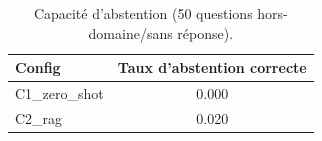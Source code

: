 \begin{table}[t]
\centering
\caption{Capacité d'abstention (50 questions hors-domaine/sans réponse).}
\label{tab:abstention}
\begin{tabular}{lc}
\toprule
Config & Taux d'abstention correcte \\
\midrule
C1_zero_shot & 0.000 \\
C2_rag & 0.020 \\
\bottomrule
\end{tabular}
\end{table}
